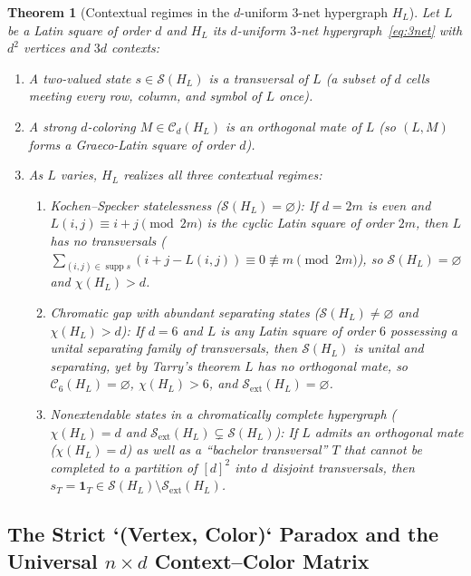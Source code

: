 \documentclass[aps,pra,reprint,superscriptaddress,longbibliography,nofootinbib,floatfix,10pt]{revtex4-2}
\newtheorem{theorem}{Theorem}
\theoremstyle{definition}\newtheorem{definition}[theorem]{Definition}
\theoremstyle{remark}\newtheorem{remark}[theorem]{Remark}
\newcommand{\Sc}{\mathcal S}\newcommand{\Cc}{\mathcal C}
\DeclareMathOperator{\supp}{supp}\DeclareMathOperator{\conv}{conv}
\begin{document}
\begin{theorem}[Contextual regimes in the $d$-uniform $3$-net hypergraph $H_L$]\label{thm:3net}
Let $L$ be a Latin square of order $d$ and $H_L$ its $d$-uniform $3$-net hypergraph~\eqref{eq:3net} with $d^2$ vertices and $3d$ contexts:
\begin{enumerate}
\item A two-valued state $s\in\Sc(H_L)$ is a \emph{transversal} of $L$ (a subset of $d$ cells meeting every row, column, and symbol of $L$ once).
\item A strong $d$-coloring $M\in\Cc_d(H_L)$ is an \emph{orthogonal mate} of $L$ (so $(L,M)$ forms a Graeco-Latin square of order $d$).
\item As $L$ varies, $H_L$ realizes all three contextual regimes:
\begin{enumerate}
\item \emph{Kochen--Specker statelessness ($\Sc(H_L)=\varnothing$):} If $d=2m$ is even and $L(i,j)\equiv i+j\pmod{2m}$ is the cyclic Latin square of order $2m$, then $L$ has no transversals ($\sum_{(i,j)\in\supp s}(i+j-L(i,j))\equiv 0\not\equiv m\pmod{2m}$), so $\Sc(H_L)=\varnothing$ and $\chi(H_L)>d$.
\item \emph{Chromatic gap with abundant separating states ($\Sc(H_L)\neq\varnothing$ and $\chi(H_L)>d$):} If $d=6$ and $L$ is any Latin square of order $6$ possessing a unital separating family of transversals, then $\Sc(H_L)$ is unital and separating, yet by Tarry's theorem $L$ has no orthogonal mate, so $\Cc_6(H_L)=\varnothing$, $\chi(H_L)>6$, and $\Sc_{\mathrm{ext}}(H_L)=\varnothing$.
\item \emph{Nonextendable states in a chromatically complete hypergraph ($\chi(H_L)=d$ and $\Sc_{\mathrm{ext}}(H_L)\subsetneq\Sc(H_L)$):} If $L$ admits an orthogonal mate ($\chi(H_L)=d$) as well as a ``bachelor transversal'' $T$ that cannot be completed to a partition of $[d]^2$ into $d$ disjoint transversals, then $s_T=\mathbf{1}_T\in\Sc(H_L)\setminus\Sc_{\mathrm{ext}}(H_L)$.
\end{enumerate}
\end{enumerate}
\end{theorem}

\subsection{The Strict `(Vertex, Color)` Paradox and the Universal \texorpdfstring{$n\times d$}{n x d} Context--Color Matrix}\label{sec:nxd-matrix}
\end{document}
